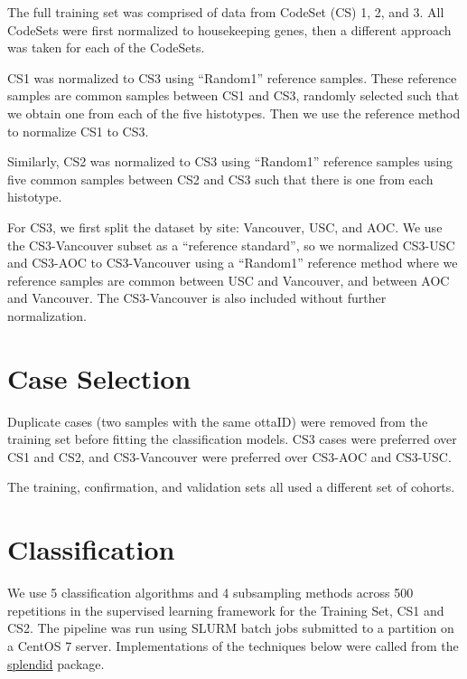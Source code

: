 \documentclass[
]{report}
\begin{document}
The full training set was comprised of data from CodeSet (CS) 1, 2, and 3. All CodeSets were first normalized to housekeeping genes, then a different approach was taken for each of the CodeSets.

CS1 was normalized to CS3 using ``Random1'' reference samples. These reference samples are common samples between CS1 and CS3, randomly selected such that we obtain one from each of the five histotypes. Then we use the reference method to normalize CS1 to CS3.

Similarly, CS2 was normalized to CS3 using ``Random1'' reference samples using five common samples between CS2 and CS3 such that there is one from each histotype.

For CS3, we first split the dataset by site: Vancouver, USC, and AOC. We use the CS3-Vancouver subset as a ``reference standard'', so we normalized CS3-USC and CS3-AOC to CS3-Vancouver using a ``Random1'' reference method where we reference samples are common between USC and Vancouver, and between AOC and Vancouver. The CS3-Vancouver is also included without further normalization.

\hypertarget{case-selection}{%
\section{Case Selection}\label{case-selection}}

Duplicate cases (two samples with the same ottaID) were removed from the training set before fitting the classification models. CS3 cases were preferred over CS1 and CS2, and CS3-Vancouver were preferred over CS3-AOC and CS3-USC.

The training, confirmation, and validation sets all used a different set of cohorts.

\hypertarget{classification}{%
\section{Classification}\label{classification}}

We use 5 classification algorithms and 4 subsampling methods across 500 repetitions in the supervised learning framework for the Training Set, CS1 and CS2. The pipeline was run using SLURM batch jobs submitted to a partition on a CentOS 7 server. Implementations of the techniques below were called from the \href{https://alinetalhouk.github.io/splendid/}{splendid} package.
\end{document}
